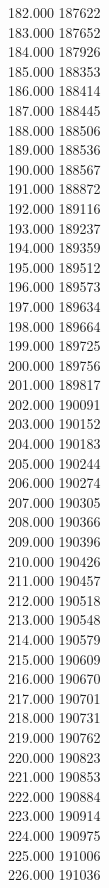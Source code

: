 { 182.000	187622 \\
 183.000	187652 \\
 184.000	187926 \\
 185.000	188353 \\
 186.000	188414 \\
 187.000	188445 \\
 188.000	188506 \\
 189.000	188536 \\
 190.000	188567 \\
 191.000	188872 \\
 192.000	189116 \\
 193.000	189237 \\
 194.000	189359 \\
 195.000	189512 \\
 196.000	189573 \\
 197.000	189634 \\
 198.000	189664 \\
 199.000	189725 \\
 200.000	189756 \\
 201.000	189817 \\
 202.000	190091 \\
 203.000	190152 \\
 204.000	190183 \\
 205.000	190244 \\
 206.000	190274 \\
 207.000	190305 \\
 208.000	190366 \\
 209.000	190396 \\
 210.000	190426 \\
 211.000	190457 \\
 212.000	190518 \\
 213.000	190548 \\
 214.000	190579 \\
 215.000	190609 \\
 216.000	190670 \\
 217.000	190701 \\
 218.000	190731 \\
 219.000	190762 \\
 220.000	190823 \\
 221.000	190853 \\
 222.000	190884 \\
 223.000	190914 \\
 224.000	190975 \\
 225.000	191006 \\
 226.000	191036 \\
}
